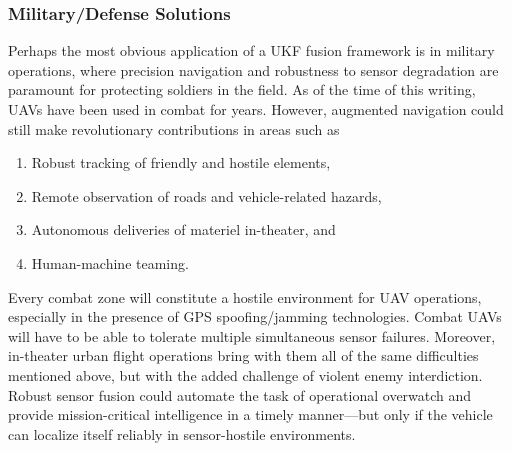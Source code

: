\subsubsection{Military/Defense Solutions}

Perhaps the most obvious application of a UKF fusion framework is in military operations, where precision navigation and robustness to sensor degradation are paramount for protecting soldiers in the field. As of the time of this writing, UAVs have been used in combat for years. However, augmented navigation could still make revolutionary contributions in areas such as
\begin{enumerate}
    \item Robust tracking of friendly and hostile elements,
    \item Remote observation of roads and vehicle-related hazards,
    \item Autonomous deliveries of materiel in-theater, and
    \item Human-machine teaming.
\end{enumerate}
Every combat zone will constitute a hostile environment for UAV operations, especially in the presence of GPS spoofing/jamming technologies. Combat UAVs will have to be able to tolerate multiple simultaneous sensor failures. Moreover, in-theater urban flight operations bring with them all of the same difficulties mentioned above, but with the added challenge of violent enemy interdiction. Robust sensor fusion could automate the task of operational overwatch and provide mission-critical intelligence in a timely manner---but only if the vehicle can localize itself reliably in sensor-hostile environments.
